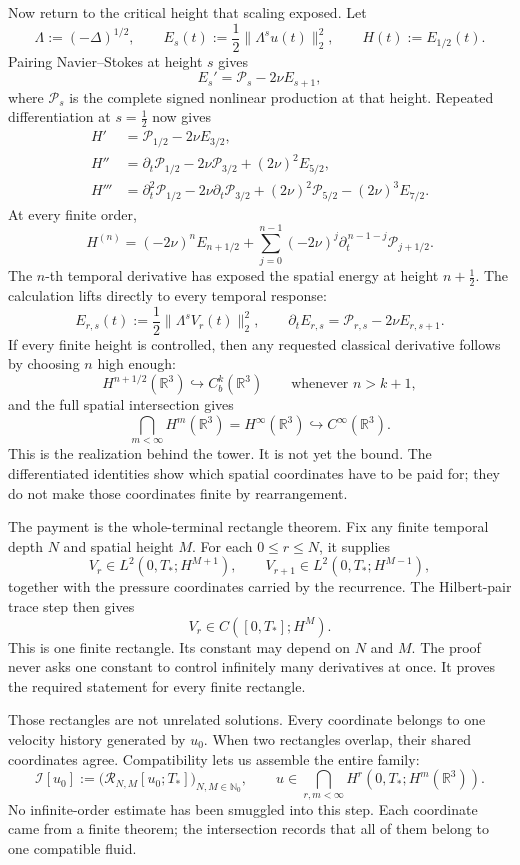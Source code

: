 Now return to the critical height that scaling exposed.  Let
\[
\Lambda:=(-\Delta)^{1/2},
\qquad
E_s(t):=\frac12\|\Lambda^su(t)\|_2^2,
\qquad
H(t):=E_{1/2}(t).
\]
Pairing Navier--Stokes at height \(s\) gives
\[
E_s'=\mathcal P_s-2\nu E_{s+1},
\]
where \(\mathcal P_s\) is the complete signed nonlinear production at that
height.  Repeated differentiation at \(s=\tfrac12\) now gives
\[
\begin{aligned}
H'
&=\mathcal P_{1/2}-2\nu E_{3/2},\\
H''
&=\partial_t\mathcal P_{1/2}
  -2\nu\mathcal P_{3/2}
  +(2\nu)^2E_{5/2},\\
H'''
&=\partial_t^2\mathcal P_{1/2}
  -2\nu\partial_t\mathcal P_{3/2}
  +(2\nu)^2\mathcal P_{5/2}
  -(2\nu)^3E_{7/2}.
\end{aligned}
\]
At every finite order,
\[
H^{(n)}
=(-2\nu)^nE_{n+1/2}
+\sum_{j=0}^{n-1}(-2\nu)^j
 \partial_t^{\,n-1-j}\mathcal P_{j+1/2}.
\]
The \(n\)-th temporal derivative has exposed the spatial energy at height
\(n+\tfrac12\).  The calculation lifts directly to every temporal response:
\[
E_{r,s}(t):=\frac12\|\Lambda^sV_r(t)\|_2^2,
\qquad
\partial_tE_{r,s}
=\mathcal P_{r,s}-2\nu E_{r,s+1}.
\]
If every finite height is controlled, then any requested classical derivative
follows by choosing \(n\) high enough:
\[
H^{n+1/2}(\mathbb R^3)\hookrightarrow C_b^k(\mathbb R^3)
\qquad\text{whenever }n>k+1,
\]
and the full spatial intersection gives
\[
\bigcap_{m<\infty}H^m(\mathbb R^3)
=H^\infty(\mathbb R^3)
\hookrightarrow C^\infty(\mathbb R^3).
\]
This is the realization behind the tower.  It is not yet the bound.  The
differentiated identities show which spatial coordinates have to be paid for;
they do not make those coordinates finite by rearrangement.

The payment is the whole-terminal rectangle theorem.  Fix any finite temporal
depth \(N\) and spatial height \(M\).  For each \(0\le r\le N\), it supplies
\[
V_r\in L^2(0,T_*;H^{M+1}),
\qquad
V_{r+1}\in L^2(0,T_*;H^{M-1}),
\]
together with the pressure coordinates carried by the recurrence.  The
Hilbert-pair trace step then gives
\[
V_r\in C([0,T_*];H^M).
\]
This is one finite rectangle.  Its constant may depend on \(N\) and \(M\).
The proof never asks one constant to control infinitely many derivatives at
once.  It proves the required statement for every finite rectangle.

Those rectangles are not unrelated solutions.  Every coordinate belongs to
one velocity history generated by \(u_0\).  When two rectangles overlap, their
shared coordinates agree.  Compatibility lets us assemble the entire family:
\[
\mathcal I[u_0]
:=\bigl(\mathcal R_{N,M}[u_0;T_*]\bigr)_{N,M\in\mathbb N_0},
\qquad
u\in\bigcap_{r,m<\infty}
H^r(0,T_*;H^m(\mathbb R^3)).
\]
No infinite-order estimate has been smuggled into this step.  Each coordinate
came from a finite theorem; the intersection records that all of them belong
to one compatible fluid.

